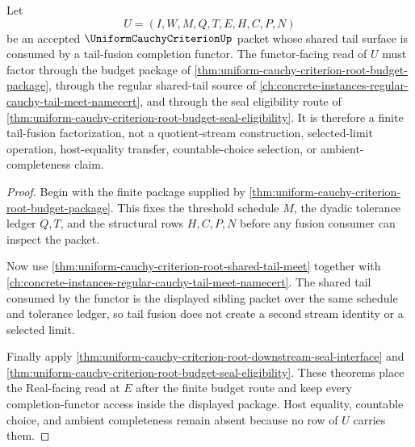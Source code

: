 \begin{theorem}
\label{thm:uniform-cauchy-criterion-regular-tail-fusion-factorization}
Let
$$
U=(I,W,M,Q,T,E,H,C,P,N)
$$
be an accepted $\UniformCauchyCriterionUp$ packet whose shared tail surface is consumed by a tail-fusion completion functor. The functor-facing read of $U$ must factor through the budget package of \autoref{thm:uniform-cauchy-criterion-root-budget-package}, through the regular shared-tail source of \autoref{ch:concrete-instances-regular-cauchy-tail-meet-namecert}, and through the seal eligibility route of \autoref{thm:uniform-cauchy-criterion-root-budget-seal-eligibility}. It is therefore a finite tail-fusion factorization, not a quotient-stream construction, selected-limit operation, host-equality transfer, countable-choice selection, or ambient-completeness claim.
\end{theorem}
\begin{proof}
Begin with the finite package supplied by \autoref{thm:uniform-cauchy-criterion-root-budget-package}. This fixes the threshold schedule $M$, the dyadic tolerance ledger $Q,T$, and the structural rows $H,C,P,N$ before any fusion consumer can inspect the packet.

Now use \autoref{thm:uniform-cauchy-criterion-root-shared-tail-meet} together with \autoref{ch:concrete-instances-regular-cauchy-tail-meet-namecert}. The shared tail consumed by the functor is the displayed sibling packet over the same schedule and tolerance ledger, so tail fusion does not create a second stream identity or a selected limit.

Finally apply \autoref{thm:uniform-cauchy-criterion-root-downstream-seal-interface} and \autoref{thm:uniform-cauchy-criterion-root-budget-seal-eligibility}. These theorems place the Real-facing read at $E$ after the finite budget route and keep every completion-functor access inside the displayed package. Host equality, countable choice, and ambient completeness remain absent because no row of $U$ carries them.
\end{proof}

